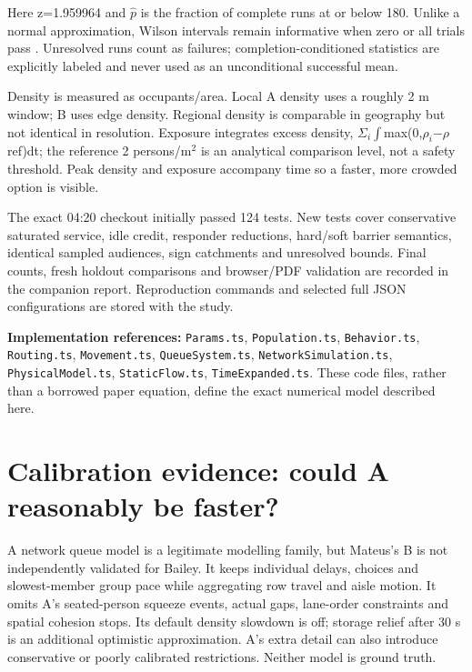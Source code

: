 \documentclass[11pt,a4paper]{article}
\newcommand{\code}[1]{{\small\nolinkurl{#1}}}
\begin{document}
Here z=1.959964 and \ensuremath{\widehat p} is the fraction of complete runs at or below 180. Unlike a normal approximation, Wilson intervals remain informative when zero or all trials pass \cite{R16}. Unresolved runs count as failures; completion-conditioned statistics are explicitly labeled and never used as an unconditional successful mean.


Density is measured as occupants/area. Local A density uses a roughly 2 m window; B uses edge density. Regional density is comparable in geography but not identical in resolution. Exposure integrates excess density, \ensuremath{\Sigma_{i}}\ensuremath{\int}max(0,\ensuremath{\rho_{i}}\ensuremath{-}\ensuremath{\rho}ref)dt; the reference 2 persons/m\ensuremath{{}^2} is an analytical comparison level, not a safety threshold. Peak density and exposure accompany time so a faster, more crowded option is visible.


The exact 04:20 checkout initially passed 124 tests. New tests cover conservative saturated service, idle credit, responder reductions, hard/soft barrier semantics, identical sampled audiences, sign catchments and unresolved bounds. Final counts, fresh holdout comparisons and browser/PDF validation are recorded in the companion report. Reproduction commands and selected full JSON configurations are stored with the study.


\textbf{Implementation references:} \code{Params.ts}, \code{Population.ts}, \code{Behavior.ts}, \code{Routing.ts}, \code{Movement.ts}, \code{QueueSystem.ts}, \code{NetworkSimulation.ts}, \code{PhysicalModel.ts}, \code{StaticFlow.ts}, \code{TimeExpanded.ts}. These code files, rather than a borrowed paper equation, define the exact numerical model described here.


\section{Calibration evidence: could A reasonably be faster?}\label{sec:17}

A network queue model is a legitimate modelling family, but Mateus's B is not independently validated for Bailey. It keeps individual delays, choices and slowest-member group pace while aggregating row travel and aisle motion. It omits A's seated-person squeeze events, actual gaps, lane-order constraints and spatial cohesion stops. Its default density slowdown is off; storage relief after 30 s is an additional optimistic approximation. A's extra detail can also introduce conservative or poorly calibrated restrictions. Neither model is ground truth.
\end{document}
